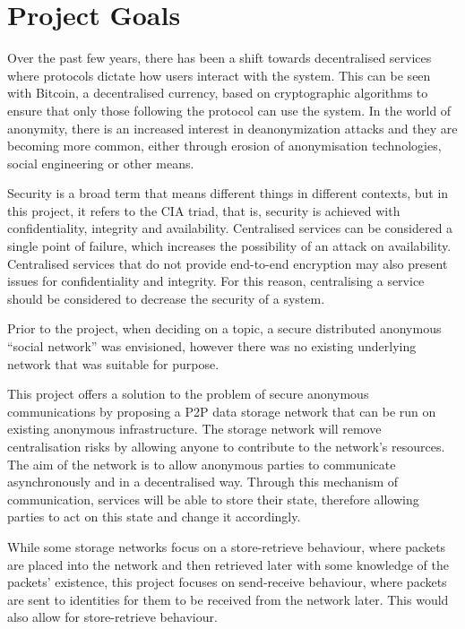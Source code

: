 \section{Project Goals}
	Over the past few years, there has been a shift towards decentralised services where protocols dictate how users interact with the system. This can be seen with Bitcoin, a decentralised currency, based on cryptographic algorithms to ensure that only those following the protocol can use the system. In the world of anonymity, there is an increased interest in deanonymization attacks and they are becoming more common, either through erosion of anonymisation technologies, social engineering or other means.
	
	Security is a broad term that means different things in different contexts, but in this project, it refers to the CIA triad, that is, security is achieved with confidentiality, integrity and availability. Centralised services can be considered a single point of failure, which increases the possibility of an attack on availability. Centralised services that do not provide end-to-end encryption may also present issues for confidentiality and integrity. For this reason, centralising a service should be considered to decrease the security of a system.
	
	Prior to the project, when deciding on a topic, a secure distributed anonymous ``social network'' was envisioned, however there was no existing underlying network that was suitable for purpose. 
	
	This project offers a solution to the problem of secure anonymous communications by proposing a P2P data storage network that can be run on existing anonymous infrastructure. The storage network will remove centralisation risks by allowing anyone to contribute to the network's resources. The aim of the network is to allow anonymous parties to communicate asynchronously and in a decentralised way. Through this mechanism of communication, services will be able to store their state, therefore allowing parties to act on this state and change it accordingly.
	
	While some storage networks focus on a store-retrieve behaviour, where packets are placed into the network and then retrieved later with some knowledge of the packets' existence, this project focuses on send-receive behaviour, where packets are sent to identities for them to be received from the network later. This would also allow for store-retrieve behaviour. 
	
